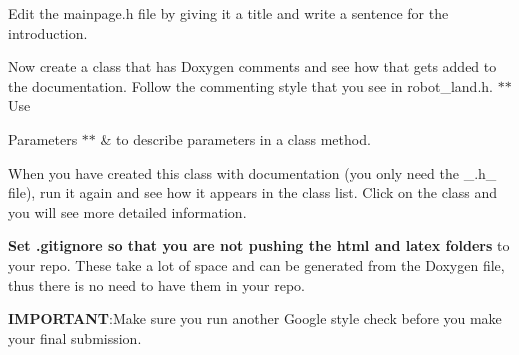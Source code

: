 \begin{DoxyEnumerate}
\item Edit the mainpage.\+h file by giving it a title and write a sentence for the introduction.
\item Now create a class that has Doxygen comments and see how that gets added to the documentation. Follow the commenting style that you see in robot\+\_\+land.\+h. $\ast$$\ast$\+Use
\begin{DoxyParams}{Parameters}
{\em $\ast$$\ast$} & to describe parameters in a class method. 
\begin{DoxyCode}{1}
\DoxyCodeLine{\}}
\end{DoxyCode}
 When you have created this class with documentation (you only need the \+\_\+.\+h\+\_\+ file), run it again and see how it appears in the class list. Click on the class and you will see more detailed information.\\
\hline
\end{DoxyParams}

\end{DoxyEnumerate}

{\bfseries{Set .gitignore so that you are not pushing the html and latex folders}} to your repo. These take a lot of space and can be generated from the Doxygen file, thus there is no need to have them in your repo.

{\bfseries{I\+M\+P\+O\+R\+T\+A\+NT}}\+:Make sure you run another Google style check before you make your final submission. 